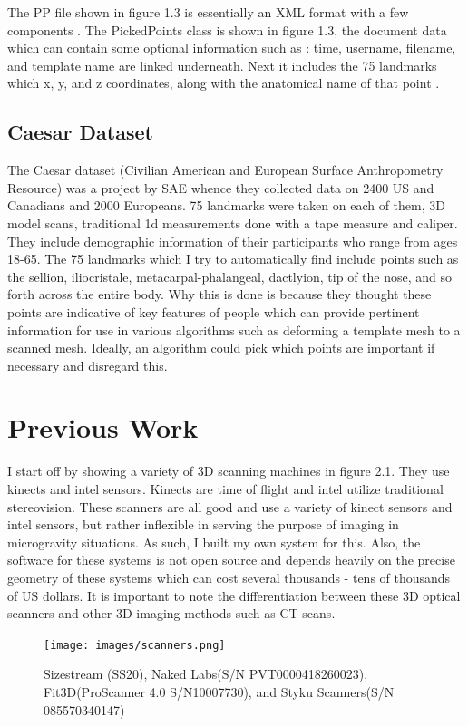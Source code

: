 The PP file shown in figure 1.3 is essentially an XML format with a few components \cite{bray2000extensible}. The PickedPoints class is shown in figure 1.3, the document data which can contain some optional information such as : time, username, filename, and template name are linked underneath. Next it includes the 75 landmarks which x, y, and z coordinates, along with the anatomical name of that point \cite{robinette2002civilian}.

\section{Caesar Dataset}
The Caesar dataset (Civilian American and European Surface Anthropometry Resource) was a project by SAE whence they collected data on 2400 US and Canadians and 2000 Europeans. 75 landmarks were taken on each of them, 3D model scans, traditional 1d measurements done with a tape measure and caliper. They include demographic information of their participants who range from ages 18-65. The 75 landmarks which I try to automatically find include points such as the sellion, iliocristale, metacarpal-phalangeal, dactlyion, tip of the nose, and so forth across the entire body. Why this is done is because they thought these points are indicative of key features of people which can provide pertinent information for use in various algorithms such as deforming a template mesh to a scanned mesh. Ideally, an algorithm could pick which points are important if necessary and disregard this.

\chapter{Previous Work}
I start off by showing a variety of 3D scanning machines in figure 2.1. They use kinects and intel sensors. Kinects are time of flight and intel utilize traditional stereovision.
These scanners are all good and use a variety of kinect sensors and intel sensors, but rather inflexible in serving the purpose of imaging in microgravity situations. As such, I built my own system for this. Also, the software for these systems is not open source and depends heavily on the precise geometry of these systems which can cost several thousands - tens of thousands of US dollars. It is important to note the differentiation between these 3D optical scanners and other 3D imaging methods such as CT scans.

\begin{figure}[!htb]
	\caption{Sizestream (SS20), Naked Labs(S/N PVT0000418260023), Fit3D(ProScanner 4.0 S/N10007730), and Styku Scanners(S/N 085570340147)}
	\centering
	\texttt{[image: images/scanners.png]}
\end{figure}

